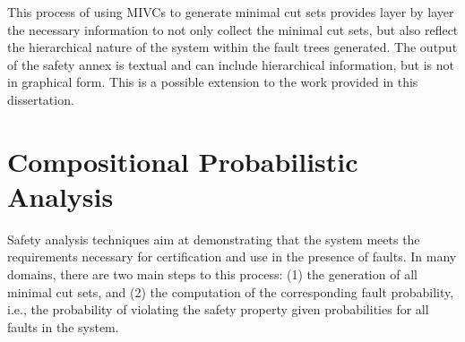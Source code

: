 This process of using MIVCs to generate minimal cut sets provides layer by layer the necessary information to not only collect the minimal cut sets, but also reflect the hierarchical nature of the system within the fault trees generated. The output of the safety annex is textual and can include hierarchical information, but is not in graphical form. This is a possible extension to the work provided in this dissertation. 





%
%


\section{Compositional Probabilistic Analysis}
Safety analysis techniques aim at demonstrating that the system meets the requirements necessary for certification and use in the presence of faults. In many domains, there are two main steps to this process: (1) the generation of all minimal cut sets, and (2) the computation of the corresponding fault probability, i.e., the probability of violating the safety property given probabilities for all faults in the system. 

